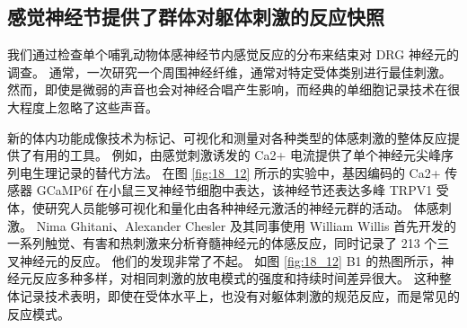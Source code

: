 \subsection{感觉神经节提供了群体对躯体刺激的反应快照}
我们通过检查单个哺乳动物体感神经节内感觉反应的分布来结束对 DRG 神经元的调查。 
通常，一次研究一个周围神经纤维，通常对特定受体类别进行最佳刺激。 
然而，即使是微弱的声音也会对神经合唱产生影响，而经典的单细胞记录技术在很大程度上忽略了这些声音。


新的体内功能成像技术为标记、可视化和测量对各种类型的体感刺激的整体反应提供了有用的工具。 
例如，由感觉刺激诱发的 Ca2+ 电流提供了单个神经元尖峰序列电生理记录的替代方法。 
在图 \ref{fig:18_12} 所示的实验中，基因编码的 Ca2+ 传感器 GCaMP6f 在小鼠三叉神经节细胞中表达，该神经节还表达多峰 TRPV1 受体，使研究人员能够可视化和量化由各种神经元激活的神经元群的活动。 体感刺激。 
Nima Ghitani、Alexander Chesler 及其同事使用 William Willis 首先开发的一系列触觉、有害和热刺激来分析脊髓神经元的体感反应，同时记录了 213 个三叉神经元的反应。 
他们的发现非常了不起。 如图 \ref{fig:18_12} B1 的热图所示，神经元反应多种多样，对相同刺激的放电模式的强度和持续时间差异很大。 
这种整体记录技术表明，即使在受体水平上，也没有对躯体刺激的规范反应，而是常见的反应模式。

